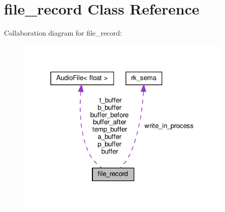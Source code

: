 \hypertarget{classfile__record}{}\section{file\+\_\+record Class Reference}
\label{classfile__record}


Collaboration diagram for file\+\_\+record\+:\nopagebreak
\begin{figure}[H]
\begin{center}
\leavevmode
\includegraphics[width=294pt]{classfile__record__coll__graph}
\end{center}
\end{figure}
